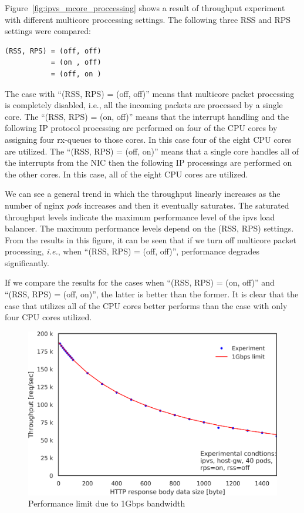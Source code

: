 Figure~\ref{fig:ipvs_mcore_proccessing} shows a result of throughput experiment with different multicore proccessing settings.
The following three RSS and RPS settings were compared: 
\begin{center}
  \centering
  \begin{minipage}{0.8\columnwidth}
\begin{verbatim}
(RSS, RPS) = (off, off)
           = (on , off)
           = (off, on )
\end{verbatim}
  \end{minipage}
\end{center}

The case with \enquote{(RSS, RPS) = (off, off)} means that multicore packet processing is completely disabled, i.e.,  all the incoming packets are processed by a single core.
The \enquote{(RSS, RPS) = (on, off)} means that the interrupt handling and the following IP protocol processing are performed on four of the CPU cores by assigning four rx-queues to those cores. In this case four of the eight CPU cores are utilized.
The \enquote{(RSS, RPS) = (off, on)} means that a single core handles all of the interrupts from the NIC then the following IP processings are performed on the other cores. In this case, all of the eight CPU cores are utilized.

We can see a general trend in which the throughput linearly increases as the number of nginx {\em pod}s increases and then it eventually saturates.
The saturated throughput levels indicate the maximum performance level of the ipvs load balancer.
The maximum performance levels depend on the (RSS, RPS) settings.
From the results in this figure, it can be seen that if we turn off multicore packet processing,
{\it i.e.}, when \enquote{(RSS, RPS) = (off, off)}, performance degrades significantly.

If we compare the results for the cases when \enquote{(RSS, RPS) = (on, off)} and \enquote{(RSS, RPS) = (off, on)},
the latter is better than the former.
It is clear that the case that utilizes all of the CPU cores better performs than the case with only four CPU cores utilized. 

\begin{figure}[h]
  \centering
  \includegraphics[width=0.8\columnwidth]{Figs/tp_limit_1gbps}
  \caption{Performance limit due to 1Gbps bandwidth}
  \label{fig:performance_limit}
\end{figure}

